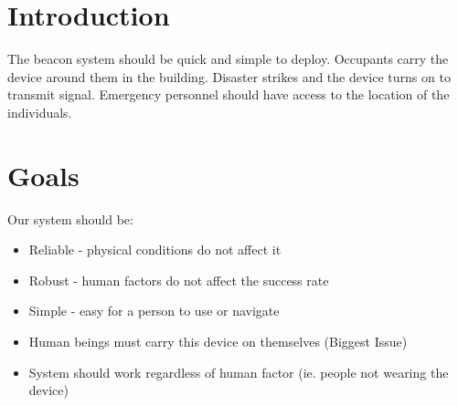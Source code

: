 
\section{Introduction}
The beacon system should be quick and simple to deploy. Occupants carry the device around them in the building. Disaster strikes and the device turns on to transmit signal. Emergency personnel should have access to the location of the individuals.

\section{Goals}
	Our system should be:
	\begin{itemize}
		\item Reliable - physical conditions do not affect it
		\item Robust - human factors do not affect the success rate
		\item Simple - easy for a person to use or navigate
		\item Human beings must carry this device on themselves (Biggest Issue)
		\item System should work regardless of human factor (ie. people not wearing the device)
	\end{itemize}
